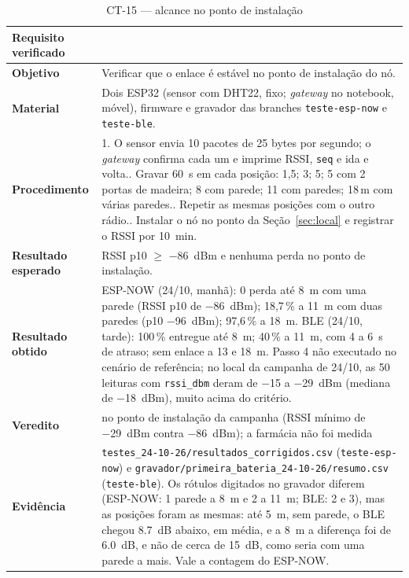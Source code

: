 \begin{table}[H]
\centering
\caption{CT-15 --- alcance no ponto de instalação}
\label{tab:ct15}
\footnotesize
\setlength{\tabcolsep}{3.5pt}
\begin{tabular}{@{}L{3.2cm}L{12.0cm}@{}}
\toprule
\textbf{Requisito verificado} &  \\
\midrule
\textbf{Objetivo} & Verificar que o enlace é estável no ponto de instalação do nó. \\
\textbf{Material} & Dois ESP32 (sensor com DHT22, fixo; \emph{gateway} no notebook, móvel), firmware e gravador das branches \texttt{teste-esp-now} e \texttt{teste-ble}. \\
\textbf{Procedimento} &
  1. O sensor envia 10 pacotes de 25 bytes por segundo; o \emph{gateway} confirma cada um e imprime RSSI, \texttt{seq} e ida e volta.. Gravar \SI{60}{\second} em cada posição: 1,5; 3; 5; 5 com 2 portas de madeira; 8 com parede; 11 com paredes; 18\,m com várias paredes.. Repetir as mesmas posições com o outro rádio.. Instalar o nó no ponto da Seção~\ref{sec:local} e registrar o RSSI por \SI{10}{\minute}. \\
\textbf{Resultado esperado} & RSSI p10 $\geq$ \SI{-86}{dBm} e nenhuma perda no ponto de instalação. \\
\textbf{Resultado obtido} & ESP-NOW (24/10, manhã): 0 perda até \SI{8}{\metre} com uma parede (RSSI p10 de \SI{-86}{dBm}); 18,7\,\% a \SI{11}{\metre} com duas paredes (p10 \SI{-96}{dBm}); 97,6\,\% a \SI{18}{\metre}. BLE (24/10, tarde): 100\,\% entregue até \SI{8}{\metre}; 40\,\% a \SI{11}{\metre}, com 4 a \SI{6}{\second} de atraso; sem enlace a 13 e \SI{18}{\metre}. Passo 4 não executado no cenário de referência; no local da campanha de 24/10, as 50 leituras com \texttt{rssi\_dbm} deram de \SI{-15}{} a \SI{-29}{dBm} (mediana de \SI{-18}{dBm}), muito acima do critério. \\
\textbf{Veredito} & \aprovado{} no ponto de instalação da campanha (RSSI mínimo de \SI{-29}{dBm} contra \SI{-86}{dBm}); a farmácia não foi medida \\
\textbf{Evidência} & \texttt{testes\_24-10-26/resultados\_corrigidos.csv} (\texttt{teste-esp-now}) e \texttt{gravador/primeira\_bateria\_24-10-26/resumo.csv} (\texttt{teste-ble}). Os rótulos digitados no gravador diferem (ESP-NOW: 1 parede a \SI{8}{\metre} e 2 a \SI{11}{\metre}; BLE: 2 e 3), mas as posições foram as mesmas: até \SI{5}{\metre}, sem parede, o BLE chegou \SI{8,7}{\deci\bel} abaixo, em média, e a \SI{8}{\metre} a diferença foi de \SI{6,0}{\deci\bel}, e não de cerca de \SI{15}{\deci\bel}, como seria com uma parede a mais. Vale a contagem do ESP-NOW. \\
\bottomrule
\end{tabular}
\end{table}

